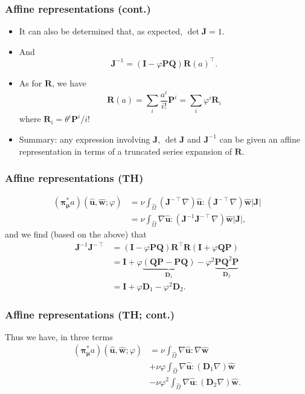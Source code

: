 \documentclass{beamer}
\begin{document}
\begin{frame}
  \frametitle{Affine representations (cont.)}

  \begin{itemize}
  \item It can also be determined that, as expected, $\det \bm J = 1$.
  \item And
    \[
      \bm J^{-1} = \left( \bm I - \varphi \bm P \bm Q \right)
      \bm R(a)^\intercal.
    \]
  \item As for $\bm R$, we have
    \[
      \bm R(a) = \sum_i \frac{a^i}{i!} \bm P^i = \sum_i \varphi^i \bm R_i
    \]
    where $\bm R_i = \theta^i \bm P^i / i!$
  \item Summary: any expression involving $\bm J$, $\det \bm J$ and
    $\bm J^{-1}$ can be given an affine representation in terms of a
    truncated series expansion of $\bm R$.
  \end{itemize}
\end{frame}

\begin{frame}
  \frametitle{Affine representations (TH)}

  \begin{align*}
  ({\bm\pi}^*_{\bm\mu}a)(
    \hat{\bm u},
    \hat{\bm w};
    \varphi
  )
  &= \nu \int_{\hat{\Omega}} (\bm J^{-\intercal} \nabla) \hat{\bm u} : (\bm J^{-\intercal} \nabla)
    \hat{\bm w} |\bm J| \\
  &= \nu \int_{\hat{\Omega}} \nabla \hat{\bm u} : (\bm J^{-1} \bm J^{-\intercal} \nabla) \hat{\bm w}
    |\bm J|,
  \end{align*}
  and we find (based on the above) that
  \begin{align*}
    \bm J^{-1} \bm J^{-\intercal}
    &= (\bm I - \varphi \bm P \bm Q) \bm R^\intercal
      \bm R (\bm I + \varphi \bm Q \bm P) \\
    &= \bm I + \varphi \underbrace{(\bm Q \bm P - \bm P \bm Q)}_{\bm D_1}
      - \varphi^2 \underbrace{\bm P \bm Q^2 \bm P}_{\bm D_2} \\
    &= \bm I + \varphi \bm D_1 - \varphi^2 \bm D_2.
  \end{align*}
\end{frame}

\begin{frame}
  \frametitle{Affine representations (TH; cont.)}

  Thus we have, in three terms
  \begin{align*}
    ({\bm\pi}^*_{\bm\mu}a)(
    \hat{\bm u},
    \hat{\bm w};
    \varphi
    ) &=
    \nu \int_{\hat{\Omega}} \nabla \hat{\bm u} : \nabla \hat{\bm w} \\
    &+ \nu \varphi \int_{\hat{\Omega}}
    \nabla \hat{\bm u} : (\bm D_1 \nabla) \hat{\bm w} \\
    &- \nu \varphi^2 \int_{\hat{\Omega}}
    \nabla \hat{\bm u} : (\bm D_2 \nabla) \hat{\bm w}.
  \end{align*}
\end{frame}
\end{document}
